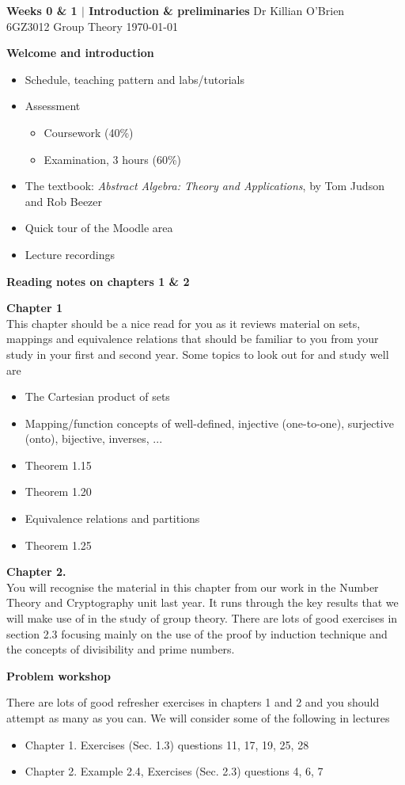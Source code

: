 \documentclass[oneside,10pt]{amsart}
\newcommand{\cbox}[1]{\begin{tcolorbox}[left=0.5mm,right=0.5mm,top=0.5mm,bottom=0.5mm, boxsep=2pt, boxrule=0pt,colback=black]\color{white}\sffamily #1 \end{tcolorbox}}
\newcommand{\tuttitle}[4]{\cbox{\textbf{#1} \hfill {#2}\\{#3} \hfill {\Small #4}}\vskip 4pt}
\newcommand{\topic}[1]{\cbox{\textbf{#1}}\vskip 4pt}
\begin{document}
\tuttitle{Weeks 0 \& 1 $|$ Introduction \& preliminaries}{Dr Killian O'Brien}{6GZ3012 Group Theory}{\today}

\topic{Welcome and introduction}
\begin{itemize}
\item
Schedule, teaching pattern and labs/tutorials
\item
Assessment
\begin{itemize}
\item
Coursework (40\%)
\item
Examination, 3 hours (60\%)
\end{itemize}
\item
The textbook: \textit{Abstract Algebra: Theory and Applications}, by Tom Judson and Rob Beezer
\item
Quick tour of the Moodle area
\item
Lecture recordings
\end{itemize}
\topic{Reading notes on chapters 1 \& 2}
\textbf{Chapter 1}\\
This chapter should be a nice read for you as it reviews material on sets, mappings and equivalence relations that should be familiar to you from your study in your first and second year. Some topics to look out for and study well are
\begin{itemize}
\item
The Cartesian product of sets
\item
Mapping/function concepts of well-defined, injective (one-to-one),  surjective (onto), bijective, inverses, ...
\item
Theorem 1.15
\item
Theorem 1.20
\item
Equivalence relations and partitions
\item
Theorem 1.25
\end{itemize}

\textbf{Chapter 2.}\\
You will recognise the material in this chapter from our work in the Number Theory and Cryptography unit last year. It runs through the key results that we will make use of in the study of group theory. There are lots of good exercises in section 2.3 focusing mainly on the use of the proof by induction technique and the concepts of divisibility and prime numbers.


\topic{Problem workshop}
There are lots of good refresher exercises in chapters 1 and 2 and you should attempt as many as you can. We will consider some of the following in lectures
\begin{itemize}
\item
Chapter 1. Exercises (Sec. 1.3) questions 11, 17, 19, 25, 28
\item
Chapter 2. Example 2.4, Exercises (Sec. 2.3) questions 4, 6, 7
\end{itemize}
\end{document}
